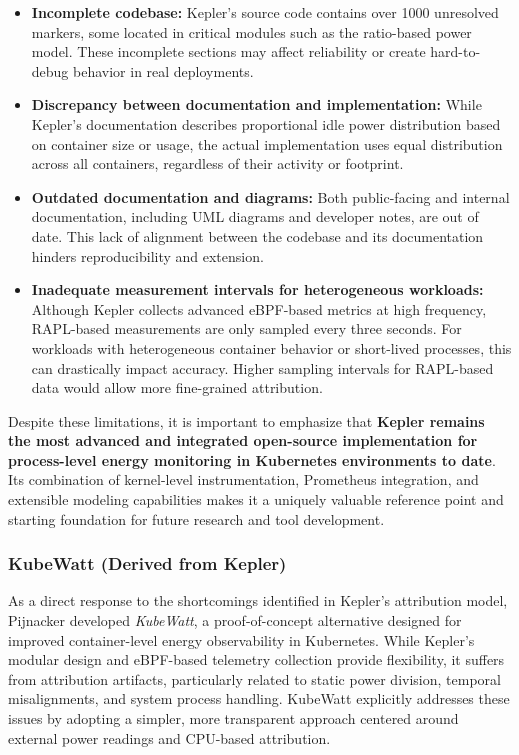 \begin{itemize}
    \item \textbf{Incomplete codebase:} Kepler’s source code contains over 1000 unresolved  markers, some located in critical modules such as the ratio-based power model. These incomplete sections may affect reliability or create hard-to-debug behavior in real deployments.
    \item \textbf{Discrepancy between documentation and implementation:} While Kepler’s documentation describes proportional idle power distribution based on container size or usage, the actual implementation uses equal distribution across all containers, regardless of their activity or footprint.
    \item \textbf{Outdated documentation and diagrams:} Both public-facing and internal documentation, including UML diagrams and developer notes, are out of date. This lack of alignment between the codebase and its documentation hinders reproducibility and extension.
    \item \textbf{Inadequate measurement intervals for heterogeneous workloads:} Although Kepler collects advanced eBPF-based metrics at high frequency, RAPL-based measurements are only sampled every three seconds. For workloads with heterogeneous container behavior or short-lived processes, this can drastically impact accuracy. Higher sampling intervals for RAPL-based data would allow more fine-grained attribution.
\end{itemize}

Despite these limitations, it is important to emphasize that \textbf{Kepler remains the most advanced and integrated open-source implementation for process-level energy monitoring in Kubernetes environments to date}. Its combination of kernel-level instrumentation, Prometheus integration, and extensible modeling capabilities makes it a uniquely valuable reference point and starting foundation for future research and tool development.

\subsubsection{KubeWatt (Derived from Kepler)}
\label{sec:kubewatt}

As a direct response to the shortcomings identified in Kepler's attribution model, Pijnacker developed \textit{KubeWatt}, a proof-of-concept alternative designed for improved container-level energy observability in Kubernetes. While Kepler's modular design and eBPF-based telemetry collection provide flexibility, it suffers from attribution artifacts, particularly related to static power division, temporal misalignments, and system process handling. KubeWatt explicitly addresses these issues by adopting a simpler, more transparent approach centered around external power readings and CPU-based attribution.

